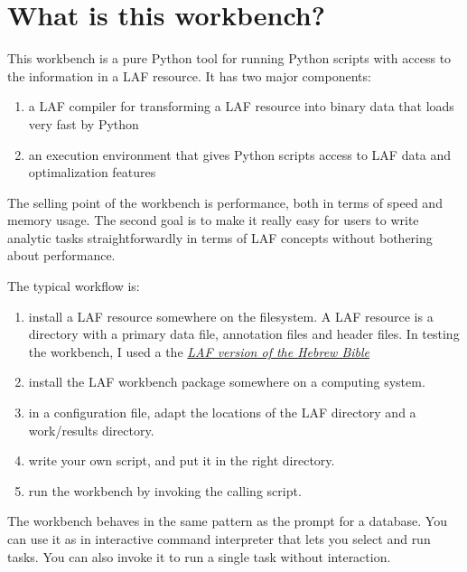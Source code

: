 \documentclass[letterpaper,10pt,english]{sphinxmanual}
\begin{document}
\section{What is this workbench?}
\label{workbench:what-is-this-workbench}
This workbench is a pure Python tool for running Python scripts with access to the information in a LAF resource.
It has two major components:
\begin{enumerate}
\item {} 
a LAF compiler for transforming a LAF resource into binary data that loads very fast by Python

\item {} 
an execution environment that gives Python scripts access to LAF data and optimalization features

\end{enumerate}

The selling point of the workbench is performance, both in terms of speed and memory usage.
The second goal is to make it really easy for users to write analytic tasks straightforwardly in terms of LAF concepts
without bothering about performance.

The typical workflow is:
\begin{enumerate}
\item {} 
install a LAF resource somewhere on the filesystem.
A LAF resource is a directory with a primary data file, annotation files and header files.
In testing the workbench, I used a the {\hyperref[overview:data]{\emph{LAF version of the Hebrew Bible}}}

\item {} 
install the LAF workbench package somewhere on a computing system.

\item {} 
in a configuration file, adapt the locations of the LAF directory and a work/results directory.

\item {} 
write your own script, and put it in the right directory.

\item {} 
run the workbench by invoking the calling script.

\end{enumerate}

The workbench behaves in the same pattern as the  prompt for a database. You can use it as in interactive
command interpreter that lets you select and run tasks.
You can also invoke it to run a single task without interaction.
\end{document}
